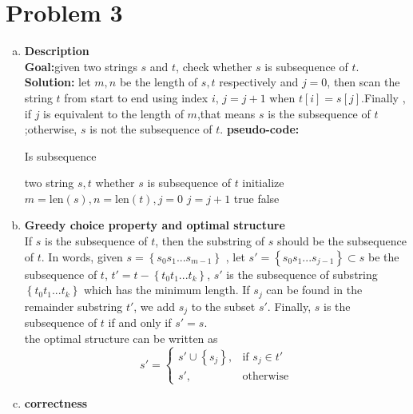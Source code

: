 \section{Problem 3}
\begin{enumerate}[a).]
	\item \textbf{Description}	\\
	\textbf{Goal:}\qquad given two strings $s$ and $t$, check whether $s$ is subsequence of $t$. \\
	\textbf{Solution:}  let $m,n$ be the length of $s,t$ respectively and $j = 0$,
	then scan the string $t$ from start to end using index $i$, 	 
	$j = j + 1$ when $t[i] = s[j]$.Finally , if $j$ is equivalent to the length of $m$,that means
	$s$ is the subsequence of $t$;otherwise, $s$ is not the subsequence of $t$.
	\textbf{pseudo-code:} 
	\begin{algorithm}[H]
		\caption{Is subsequence}
		\begin{algorithmic}[1]
			\Require\quad two string $s,t$
			\Ensure  whether $s$ is subsequence of $t$	
			\State initialize $m = \text{len}(s), n = \text{len}(t), j = 0$
			\State $j = j +1 $
			\EndIf 
			\EndFor 
			\State \Return true
			\Else
			\State \Return false
			\EndIf 				 
			\EndFunction 
		\end{algorithmic} 
	\end{algorithm}
	\item \textbf{Greedy choice property and optimal structure} \\
	If $s$ is the subsequence of $t$, then the substring of $s$ should be the subsequence of $t$.	
	In words, given $s = \left\lbrace s_0s_1...s_{m-1}\right\rbrace$ , 
	let $s' = \left\lbrace {s_0 s_1 ... s_{j-1}}\right\rbrace \subset s$ be the subsequence of $t$, 
	$t' = t - \left\lbrace{t_0 t_1 ... t_k}\right\rbrace $, $s'$ is the subsequence of substring 
	$\left\lbrace{t_0 t_1 ... t_k}\right\rbrace$ which has 
	the minimum length.
	If $s_{j}$ can be found in the remainder substring $t'$,
	we add $s_{j}$ to the subset $s'$.
	Finally,  $s$ is the subsequence of $t$ if and only if $s' = s$. \\
	the optimal structure can be written as 
	\[
	s' = \left\lbrace \begin{split}
	s'\cup {\left\lbrace s_j \right\rbrace} , &\text{if } s_j \in t' \\
	s', &\text{otherwise} 
	\end{split} 
	\right.  
	\]
	\item \textbf{correctness} \\

\end{enumerate}

